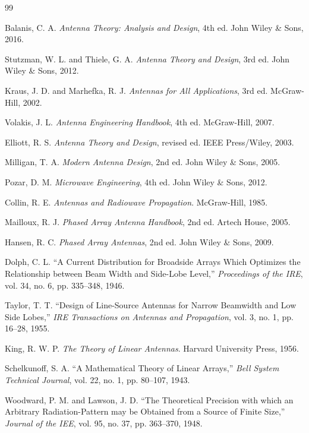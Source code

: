 \documentclass[a4paper, 11pt]{article}
\begin{document}
\begin{thebibliography}{99}

Balanis, C. A. \textit{Antenna Theory: Analysis and Design}, 4th ed. John Wiley \& Sons, 2016.

Stutzman, W. L. and Thiele, G. A. \textit{Antenna Theory and Design}, 3rd ed. John Wiley \& Sons, 2012.

Kraus, J. D. and Marhefka, R. J. \textit{Antennas for All Applications}, 3rd ed. McGraw-Hill, 2002.

Volakis, J. L. \textit{Antenna Engineering Handbook}, 4th ed. McGraw-Hill, 2007.

Elliott, R. S. \textit{Antenna Theory and Design}, revised ed. IEEE Press/Wiley, 2003.

Milligan, T. A. \textit{Modern Antenna Design}, 2nd ed. John Wiley \& Sons, 2005.

Pozar, D. M. \textit{Microwave Engineering}, 4th ed. John Wiley \& Sons, 2012.

Collin, R. E. \textit{Antennas and Radiowave Propagation}. McGraw-Hill, 1985.

Mailloux, R. J. \textit{Phased Array Antenna Handbook}, 2nd ed. Artech House, 2005.

Hansen, R. C. \textit{Phased Array Antennas}, 2nd ed. John Wiley \& Sons, 2009.

Dolph, C. L. ``A Current Distribution for Broadside Arrays Which Optimizes the Relationship between Beam Width and Side-Lobe Level,'' \textit{Proceedings of the IRE}, vol. 34, no. 6, pp. 335--348, 1946.

Taylor, T. T. ``Design of Line-Source Antennas for Narrow Beamwidth and Low Side Lobes,'' \textit{IRE Transactions on Antennas and Propagation}, vol. 3, no. 1, pp. 16--28, 1955.

King, R. W. P. \textit{The Theory of Linear Antennas}. Harvard University Press, 1956.

Schelkunoff, S. A. ``A Mathematical Theory of Linear Arrays,'' \textit{Bell System Technical Journal}, vol. 22, no. 1, pp. 80--107, 1943.

Woodward, P. M. and Lawson, J. D. ``The Theoretical Precision with which an Arbitrary Radiation-Pattern may be Obtained from a Source of Finite Size,'' \textit{Journal of the IEE}, vol. 95, no. 37, pp. 363--370, 1948.


\end{thebibliography}
\end{document}
